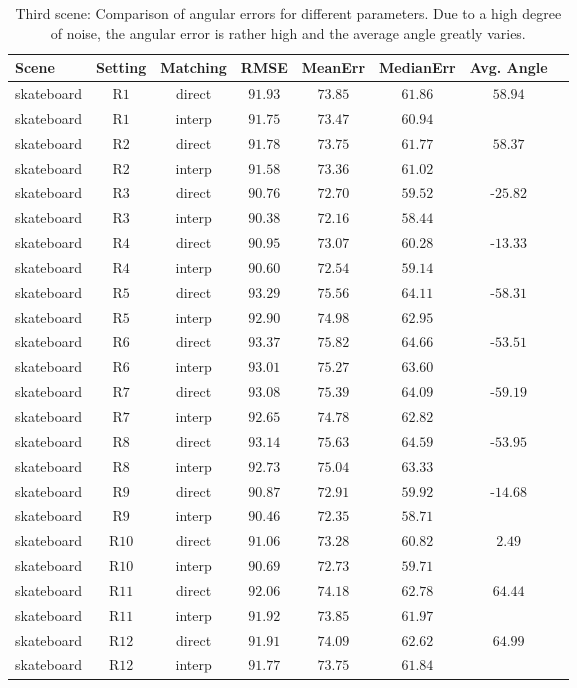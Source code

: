 \begin{appendix}
\begin{table}[tb]
	\centering
		\begin{tabular}{lccccccc}
Scene & Setting & Matching & RMSE & MeanErr & MedianErr & Avg. Angle \\
\hline  \hline
skateboard & R$1$ & direct & $91.93$ & $73.85$ & $61.86$ & $58.94$ & \\
skateboard & R$1$ & interp & $91.75$ & $73.47$ & $60.94$ &  & \\
skateboard & R$2$ & direct & $91.78$ & $73.75$ & $61.77$ & $58.37$ & \\
skateboard & R$2$ & interp & $91.58$ & $73.36$ & $61.02$ &  & \\
skateboard & R$3$ & direct & $90.76$ & $72.70$ & $59.52$ & -$25.82$ & \\
skateboard & R$3$ & interp & $90.38$ & $72.16$ & $58.44$ &  & \\
skateboard & R$4$ & direct & $90.95$ & $73.07$ & $60.28$ & -$13.33$ & \\
skateboard & R$4$ & interp & $90.60$ & $72.54$ & $59.14$ &  & \\
skateboard & R$5$ & direct & $93.29$ & $75.56$ & $64.11$ & -$58.31$ & \\
skateboard & R$5$ & interp & $92.90$ & $74.98$ & $62.95$ &  & \\
skateboard & R$6$ & direct & $93.37$ & $75.82$ & $64.66$ & -$53.51$ & \\
skateboard & R$6$ & interp & $93.01$ & $75.27$ & $63.60$ &  & \\
skateboard & R$7$ & direct & $93.08$ & $75.39$ & $64.09$ & -$59.19$ & \\
skateboard & R$7$ & interp & $92.65$ & $74.78$ & $62.82$ &  & \\
skateboard & R$8$ & direct & $93.14$ & $75.63$ & $64.59$ & -$53.95$ & \\
skateboard & R$8$ & interp & $92.73$ & $75.04$ & $63.33$ &  & \\
skateboard & R$9$ & direct & $90.87$ & $72.91$ & $59.92$ & -$14.68$ & \\
skateboard & R$9$ & interp & $90.46$ & $72.35$ & $58.71$ &  & \\
skateboard & R$10$ & direct & $91.06$ & $73.28$ & $60.82$ & $2.49$ & \\
skateboard & R$10$ & interp & $90.69$ & $72.73$ & $59.71$ &  & \\
skateboard & R$11$ & direct & $92.06$ & $74.18$ & $62.78$ & $64.44$ & \\
skateboard & R$11$ & interp & $91.92$ & $73.85$ & $61.97$ &  & \\
skateboard & R$12$ & direct & $91.91$ & $74.09$ & $62.62$ & $64.99$ & \\
skateboard & R$12$ & interp & $91.77$ & $73.75$ & $61.84$ &  & \\
		\end{tabular}
	\caption[Third scene: Comparison of angular errors for different parameters.]{Third scene: Comparison of angular errors for different parameters. 
	Due to a high degree of noise, the angular error is rather high and the average angle greatly varies.}
	\label{tab:app_error_comparison_skateboard}
\end{table}


\end{appendix}
